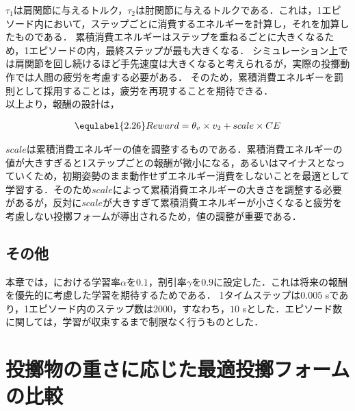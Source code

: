 $\tau_{1}$は肩関節に与えるトルク，$\tau_{2}$は肘関節に与えるトルクである．これは，1エピソード内において，ステップごとに消費するエネルギーを計算し，それを加算したものである．
累積消費エネルギーはステップを重ねるごとに大きくなるため，1エピソードの内，最終ステップが最も大きくなる．
シミュレーション上では肩関節を回し続けるほど手先速度は大きくなると考えられるが，実際の投擲動作では人間の疲労を考慮する必要がある．
そのため，累積消費エネルギーを罰則として採用することは，疲労を再現することを期待できる．\\
以上より，報酬の設計は，

\begin{eqnarray}
  \equlabel{2.26}
  Reward = \theta_{v} \times v_{2} + scale \times CE
\end{eqnarray}

$scale$は累積消費エネルギーの値を調整するものである．累積消費エネルギーの値が大きすぎると1ステップごとの報酬が微小になる，あるいはマイナスとなっていくため，初期姿勢のまま動作せずエネルギー消費をしないことを最適として学習する．そのため$scale$によって累積消費エネルギーの大きさを調整する必要があるが，反対に$scale$が大きすぎて累積消費エネルギーが小さくなると疲労を考慮しない投擲フォームが導出されるため，値の調整が重要である．
\subsection{その他}
本章では，における学習率$\alpha$を$0.1$，割引率$\gamma$を$0.9$に設定した．これは将来の報酬を優先的に考慮した学習を期待するためである．
1タイムステップは$0.005$ sであり，1エピソード内のステップ数は2000，すなわち，$10$ sとした．エピソード数に関しては，学習が収束するまで制限なく行うものとした．
\section{投擲物の重さに応じた最適投擲フォームの比較}
